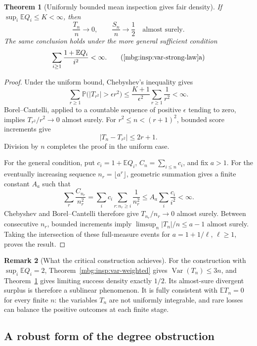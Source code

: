 \documentclass[11pt,letterpaper]{article}
\newtheorem{theorem}{Theorem}[section]
\theoremstyle{definition}
\newtheorem{remark}[theorem]{Remark}
\newcommand{\E}{\mathbb E}
\newcommand{\Prb}{\mathbb P}
\DeclareMathOperator{\Var}{Var}
\begin{document}
\begin{theorem}[Uniformly bounded mean inspection gives fair density]
\label{mbg:insp:var-strong-law}
If $\sup_i\E Q_i\le K<\infty$, then
\[
 \frac{T_n}{n}\longrightarrow0,
 \qquad \frac{S_n}{n}\longrightarrow\frac12
 \quad\text{almost surely}.
\]
The same conclusion holds under the more general sufficient condition
\[
 \sum_{i\ge1}\frac{1+\E Q_i}{i^2}<\infty.
 \tag{\ref{mbg:insp:var-strong-law}a}
\]
\end{theorem}

\begin{proof}
Under the uniform bound, Chebyshev's inequality gives
\[
 \sum_{r\ge1}
 \Prb\bigl(|T_{r^2}|>\epsilon r^2\bigr)
 \le\frac{K+1}{\epsilon^2}\sum_{r\ge1}\frac1{r^2}<\infty.
\]
Borel--Cantelli, applied to a countable sequence of positive
$\epsilon$ tending to zero, implies $T_{r^2}/r^2\to0$ almost surely.
For $r^2\le n<(r+1)^2$, bounded score increments give
\[
 |T_n-T_{r^2}|\le2r+1.
\]
Division by $n$ completes the proof in the uniform case.

For the general condition, put $c_i=1+\E Q_i$,
$C_n=\sum_{i\le n}c_i$, and fix $a>1$.
For the eventually increasing sequence $n_r=\lfloor a^r\rfloor$,
geometric summation gives a finite constant $A_a$ such that
\[
 \sum_r\frac{C_{n_r}}{n_r^2}
 =\sum_i c_i\sum_{r:n_r\ge i}\frac1{n_r^2}
 \le A_a\sum_i\frac{c_i}{i^2}<\infty.
\]
Chebyshev and Borel--Cantelli therefore give $T_{n_r}/n_r\to0$
almost surely.  Between consecutive $n_r$, bounded increments imply
$\limsup_n|T_n|/n\le a-1$ almost surely.
Taking the intersection of these full-measure events for
$a=1+1/\ell$, $\ell\ge1$, proves the result.
\end{proof}

\begin{remark}[What the critical construction achieves]
\label{mbg:insp:var-density-interpretation}
For the construction with $\sup_i\E Q_i=2$,
Theorem~\ref{mbg:insp:var-weighted} gives $\Var(T_n)\le3n$, and
Theorem~\ref{mbg:insp:var-strong-law} gives limiting success density exactly
$1/2$.  Its almost-sure divergent surplus is therefore a sublinear
phenomenon.  It is fully consistent with $\E T_n=0$ for every finite
$n$: the variables $T_n$ are not uniformly integrable, and rare losses
can balance the positive outcomes at each finite stage.
\end{remark}

\subsection{A robust form of the degree obstruction}
\end{document}
